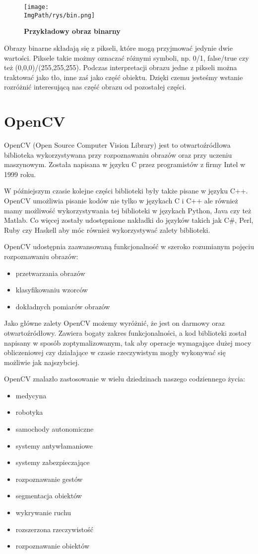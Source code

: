 \documentclass[a4paper,12pt,twoside,openany]{report}
\newcommand{\ImgPath}{.}
\begin{document}
\begin{figure}[H]	
	\centering
	\texttt{[image: \\ImgPath/rys/bin.png]}
	
	\caption{  \textbf{Przykładowy obraz binarny}}
\end{figure}

Obrazy binarne składają się z pikseli, które mogą przyjmować jedynie dwie wartości. Piksele takie możmy oznaczać różnymi symboli, np. 0/1, false/true czy też (0,0,0)/(255,255,255). Podczas interpretacji obrazu jedne z pikseli można traktować jako tło, inne zaś jako część obiektu. Dzięki czemu jesteśmy wstanie rozróżnić interesującą nas część obrazu od pozostałej części. 

\section{OpenCV}
OpenCV (Open Source Computer Vision Library) jest to otwartoźródłowa biblioteka wykorzystywana przy rozpoznawaniu obrazów oraz przy uczeniu maszynowym. Została napisana w języku C przez programistów z firmy Intel w 1999 roku.

W późniejszym czasie kolejne części biblioteki były także pisane w języku C++. OpenCV umożliwia pisanie kodów nie tylko w językach C i C++ ale również mamy możliwość wykorzystywania tej biblioteki w językach Python, Java czy też Matlab. Co więcej zostały udostępnione nakładki do języków takich jak C\#, Perl, Ruby czy Haskell aby móc również wykorzystywać zalety  biblioteki. 

OpenCV udostępnia zaawansowaną funkcjonalność  w szeroko rozumianym pojęciu rozpoznawaniu obrazów:

\begin{itemize}
	\item przetwarzania obrazów
	\item klasyfikowaniu wzorców
	\item dokładnych pomiarów obrazów
\end{itemize}

Jako główne zalety OpenCV możemy wyróżnić, że jest on darmowy oraz otwartoźródłowy. Zawiera bogaty zakres funkcjonalności, a kod biblioteki został napisany w sposób zoptymalizowanym, tak aby operacje wymagające dużej mocy obliczeniowej czy działające w czasie rzeczywistym mogły wykonywać się możliwie jak najszybciej.

OpenCV znalazło zastosowanie w wielu dziedzinach naszego codziennego życia:
\begin{itemize} 
	\item medycyna
	\item robotyka
	\item samochody autonomiczne
	\item systemy antywłamaniowe 
	\item systemy zabezpieczające
	\item rozpoznawanie gestów
	\item segmentacja obiektów
	\item wykrywanie ruchu
	\item rozszerzona rzeczywistość
	\item rozpoznawanie obiektów
\end{itemize}
\end{document}
